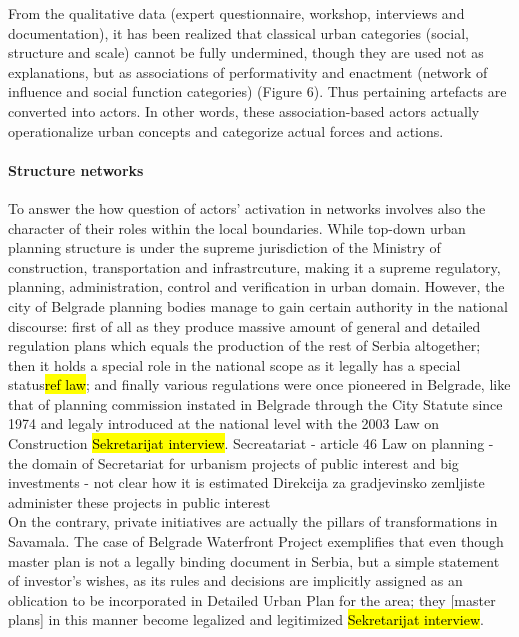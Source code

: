 \documentclass[11pt]{report}
\begin{document}
From the qualitative data (expert questionnaire, workshop, interviews and documentation), it has been realized that classical urban categories (social, structure and scale) cannot be fully undermined, though they are used not as explanations, but as associations of performativity and enactment (network of influence and social function categories) (Figure 6). Thus pertaining artefacts are converted into actors. In other words, these association-based actors actually operationalize urban concepts and categorize actual forces and actions.

\paragraph{Structure networks}

To answer the how question of actors' activation in networks involves also the character of their roles within the local boundaries.
While top-down urban planning structure is under the supreme jurisdiction of the Ministry of construction, transportation and infrastrcuture, making it a supreme regulatory, planning, administration, control and verification in urban domain.
However, the city of Belgrade planning bodies manage to gain certain authority in the national discourse: first of all as they produce massive amount of general and detailed regulation plans which equals the production of the rest of Serbia altogether; then it holds a special role in the national scope as it legally has a special status\footnotemark \hl{ref law}; and finally various regulations were once pioneered in Belgrade, like that of planning commission instated in Belgrade through the City Statute since 1974 and legaly introduced at the national level with the 2003 Law on Construction \hl{Sekretarijat interview}.
Secreatariat - article 46 Law on planning - the domain of Secretariat for urbanism
projects of public interest and big investments - not clear how it is estimated
Direkcija za gradjevinsko zemljiste administer these projects in public interest
\\
On the contrary, private initiatives are actually the pillars of transformations in Savamala. The case of Belgrade Waterfront Project exemplifies that even though master plan is not a legally binding document in Serbia, but a simple statement of investor's wishes, as its rules and decisions are implicitly assigned as an oblication to be incorporated in Detailed Urban Plan for the area; they [master plans] in this manner become legalized and legitimized \hl{Sekretarijat interview}.
\end{document}
